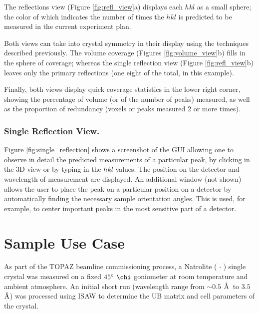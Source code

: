 \documentclass[final]{iucr}              %
\newcommand{\ang}{$\mathrm{\AA} $}
\begin{document}
The reflections view (Figure \ref{fig:refl_view}a) displays each $hkl$ as a
small sphere; the color of which indicates the number of times the $hkl$ is
predicted to be measured in the current experiment plan.        

Both views can take into crystal symmetry in their display using the techniques
described previously. 
The volume coverage (Figures \ref{fig:volume_view}b) fills in the sphere of
coverage; 
whereas the single reflection view (Figure \ref{fig:refl_view}b) leaves only
the primary reflections (one eight of the total, in this example).
 
Finally, both views display quick coverage statistics in the lower right
corner, showing the percentage of volume (or of the number of peaks) measured,
as well as the proportion of redundancy (voxels or peaks measured 2 or more
times). 

\subsubsection{Single Reflection View.}
Figure \ref{fig:single_reflection} shows a screenshot of the GUI allowing one to
observe in detail the predicted measurements of a particular peak, by clicking
in the 3D view or by typing in the $hkl$ values. The position on the detector
and wavelength of measurement are displayed. An additional window (not shown) allows the user to place the peak on a particular
position on a detector by automatically finding the necessary sample orientation
angles. This is used, for example, to center important peaks in the most
sensitive part of a detector.



\section{Sample Use Case}

As part of the TOPAZ beamline commissioning process, a Natrolite
( $\cdot$ ) single crystal was measured on a fixed
$45\degree\ \chi$ goniometer at room temperature and ambient atmosphere. An
initial short run (wavelength range from $\sim0.5$ \ang\ to $3.5$ \ang)
was processed using ISAW to determine the UB matrix and cell parameters of the crystal.
\end{document}
